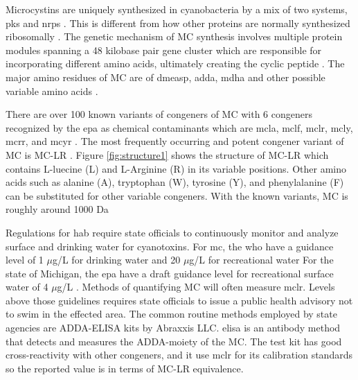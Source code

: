 Microcystins are uniquely synthesized in cyanobacteria by a mix of two systems, \gls{pks} and  \gls{nrps} \cite{tillett_structural_2000}. This is different from how other proteins are normally synthesized ribosomally . The genetic mechanism of MC synthesis involves multiple protein modules spanning a 48 kilobase pair gene cluster which are responsible for incorporating different amino acids, ultimately creating the cyclic peptide \cite{moffitt_characterization_2004,nishizawa_genetic_1999}. The major amino residues of MC  are of \gls{dmeasp}, \gls{adda},  \gls{mdha} and other possible variable amino acids \cite{trogen_conformational_1996,nishizawa_genetic_1999}.

There are over 100 known variants of congeners of MC with 6 congeners recognized by the \gls{epa} as chemical contaminants which are \gls{mcla}, \gls{mclf}, \gls{mclr}, \gls{mcly}, \gls{mcrr}, and \gls{mcyr} \cite{puddick_modulation_2016}. The most frequently occurring and potent congener variant of MC is MC-LR \cite{rastogi_cyanotoxin-microcystins:_2014}. Figure \ref{fig:structure1} shows the structure of MC-LR which contains L-luecine (L) and L-Arginine (R) in its variable positions. Other amino acids such as alanine (A), tryptophan (W), tyrosine (Y), and phenylalanine (F) can be substituted for other variable congeners.
With the known variants, MC is roughly around 1000 Da \cite{dittmann_cyanobacterial_2012}

Regulations for \gls{hab} require state officials to continuously monitor and analyze surface and drinking water for cyanotoxins. For \gls{mc}, the \gls{who} have a guidance level of 1 $\mu$g/L for drinking water and 20 $\mu$g/L for recreational water \cite{world_health_organization_guidelines_2003} For the state of Michigan, the \gls{epa} have a draft guidance level for recreational surface water of 4 $\mu$g/L \cite{usepa_draft_2016}. Methods of quantifying MC will often measure \gls{mclr}. Levels above those guidelines requires state officials to issue a public health advisory not to swim in the effected area.  The common routine methods employed by state agencies are ADDA-ELISA kits by Abraxxis LLC. \gls{elisa} is an antibody method that detects and measures the ADDA-moiety of the MC.
The test kit has good cross-reactivity with other congeners, and it use \gls{mclr} for its calibration standards so the reported value is in terms of MC-LR equivalence.

